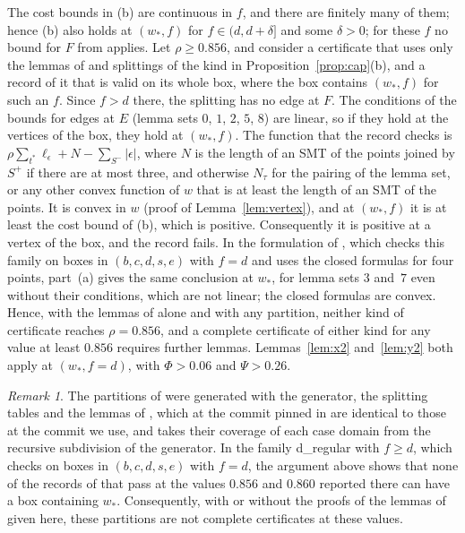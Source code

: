 \documentclass[11pt]{amsart}
\theoremstyle{definition}
\theoremstyle{remark}
\newtheorem{remark}[theorem]{Remark}
\numberwithin{equation}{section}
\begin{document}
The cost bounds in (b) are continuous in $f$, and there are finitely many of them; hence (b) also holds at $(w_*,f)$ for $f\in(d,d+\delta]$ and some $\delta>0$; for these $f$ no bound for $F$ from \cite{KHSHGW} applies. Let $\rho\ge0.856$, and consider a certificate that uses only the lemmas of \cite{KHSHGW} and splittings of the kind in Proposition~\ref{prop:cap}(b), and a record of it that is valid on its whole box, where the box contains $(w_*,f)$ for such an $f$. Since $f>d$ there, the splitting has no edge at $F$. The conditions of the bounds for edges at $E$ (lemma sets $0$, $1$, $2$, $5$, $8$) are linear, so if they hold at the vertices of the box, they hold at $(w_*,f)$. The function that the record checks is $\rho\sum_{t^*}\ell_\epsilon+N-\sum_{S^-}|\epsilon|$, where $N$ is the length of an SMT of the points joined by $S^+$ if there are at most three, and otherwise $N_\tau$ for the pairing of the lemma set, or any other convex function of $w$ that is at least the length of an SMT of the points. It is convex in $w$ (proof of Lemma~\ref{lem:vertex}), and at $(w_*,f)$ it is at least the cost bound of (b), which is positive. Consequently it is positive at a vertex of the box, and the record fails. In the formulation of \cite{KHSHGW}, which checks this family on boxes in $(b,c,d,s,e)$ with $f=d$ and uses the closed formulas for four points, part~(a) gives the same conclusion at $w_*$, for lemma sets $3$ and~$7$ even without their conditions, which are not linear; the closed formulas are convex. Hence, with the lemmas of \cite{KHSHGW} alone and with any partition, neither kind of certificate reaches $\rho=0.856$, and a complete certificate of either kind for any value at least $0.856$ requires further lemmas. Lemmas~\ref{lem:x2} and~\ref{lem:y2} both apply at $(w_*,f=d)$, with $\Phi>0.06$ and $\Psi>0.26$.

\begin{remark}\label{rem:S26}
The partitions of \cite{S26} were generated with the generator, the splitting tables and the lemmas of \cite{KHSHGW}, which at the commit pinned in \cite{S26} are identical to those at the commit we use, and \cite[Section~7]{S26} takes their coverage of each case domain from the recursive subdivision of the generator. In the family d\_regular with $f\ge d$, which \cite{KHSHGW} checks on boxes in $(b,c,d,s,e)$ with $f=d$, the argument above shows that none of the records of \cite{S26} that pass at the values $0.856$ and $0.860$ reported there can have a box containing $w_*$. Consequently, with or without the proofs of the lemmas of \cite{KHSHGW} given here, these partitions are not complete certificates at these values.
\end{remark}
\end{document}
